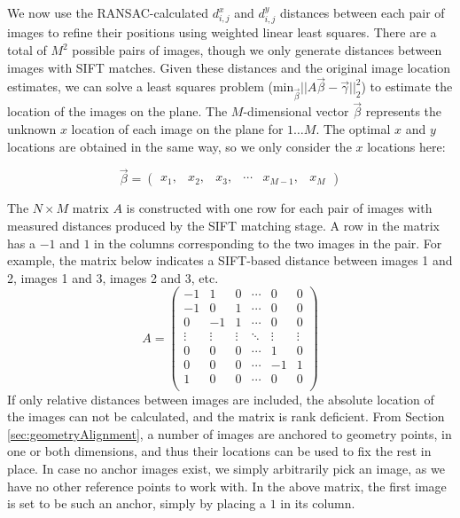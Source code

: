 \documentclass[]{spie}  %
\begin{document}
We now use the RANSAC-calculated $d^x_{i,j}$ and $d^y_{i,j}$ distances
between each pair of images to refine their positions using weighted
linear least squares. There are a total of $M^{2}$ possible pairs of
images, though we only generate distances between images with SIFT
matches. Given these distances and the original image location
estimates, we can solve a least squares problem
($\textrm{min}_{\vec{\beta}} ||A \vec{\beta} - \vec{\gamma}||_2^2 $)
to estimate the location of the images on the plane. The
$M$-dimensional vector $\vec{\beta}$ represents the unknown $x$
location of each image on the plane for $1 \dots M$. The optimal $x$
and $y$ locations are obtained in the same way, so we only consider
the $x$ locations here:

\[\vec{\beta} =
\begin{pmatrix}
  x_1, & x_2, & x_3, & \cdots & x_{M-1}, & x_M
\end{pmatrix}
\]

The $N \times M$ matrix $A$ is constructed with one row for each pair
of images with measured distances produced by the SIFT matching
stage. A row in the matrix has a $-1$ and $1$ in the columns
corresponding to the two images in the pair. For example, the matrix
below indicates a SIFT-based distance between images 1 and 2, images 1
and 3, images 2 and 3, etc.
\[
A =
\begin{pmatrix}
  -1 & 1 & 0 & \cdots & 0 & 0\\
  -1 & 0 & 1 & \cdots & 0 & 0\\
  0 & -1 & 1 & \cdots & 0 & 0\\
  \vdots  & \vdots & \vdots & \ddots & \vdots  & \vdots\\
  0 & 0 & 0 & \cdots & 1 & 0 \\
  0 & 0 & 0 & \cdots & -1 & 1 \\
  1 & 0 & 0 & \cdots & 0 & 0\\
\end{pmatrix}
\]
If only relative distances between images are included, the absolute
location of the images can not be calculated, and the matrix is rank
deficient. From Section \ref{sec:geometryAlignment}, a number of
images are anchored to geometry points, in one or both dimensions, and
thus their locations can be used to fix the rest in place. In case no
anchor images exist, we simply arbitrarily pick an image, as we have
no other reference points to work with. In the above matrix, the first
image is set to be such an anchor, simply by placing a $1$ in its
column.
\end{document}
